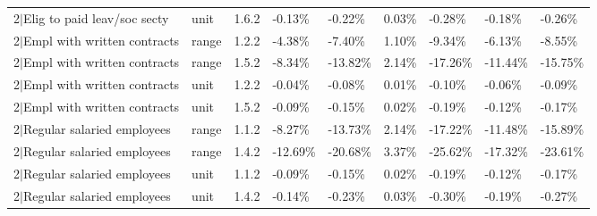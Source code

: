 \begin{table}[ht]
\begin{tabular}{lllllllll}
  2$|$Elig to paid leav/soc secty & unit & 1.6.2 & -0.13\% & -0.22\% & 0.03\% & -0.28\% & -0.18\% & -0.26\% \\ 
  2$|$Empl with written contracts & range & 1.2.2 & -4.38\% & -7.40\% & 1.10\% & -9.34\% & -6.13\% & -8.55\% \\ 
  2$|$Empl with written contracts & range & 1.5.2 & -8.34\% & -13.82\% & 2.14\% & -17.26\% & -11.44\% & -15.75\% \\ 
  2$|$Empl with written contracts & unit & 1.2.2 & -0.04\% & -0.08\% & 0.01\% & -0.10\% & -0.06\% & -0.09\% \\ 
  2$|$Empl with written contracts & unit & 1.5.2 & -0.09\% & -0.15\% & 0.02\% & -0.19\% & -0.12\% & -0.17\% \\ 
  2$|$Regular salaried employees & range & 1.1.2 & -8.27\% & -13.73\% & 2.14\% & -17.22\% & -11.48\% & -15.89\% \\ 
  2$|$Regular salaried employees & range & 1.4.2 & -12.69\% & -20.68\% & 3.37\% & -25.62\% & -17.32\% & -23.61\% \\ 
  2$|$Regular salaried employees & unit & 1.1.2 & -0.09\% & -0.15\% & 0.02\% & -0.19\% & -0.12\% & -0.17\% \\ 
  2$|$Regular salaried employees & unit & 1.4.2 & -0.14\% & -0.23\% & 0.03\% & -0.30\% & -0.19\% & -0.27\% \\ 
   \hline
\end{tabular}
\end{table}
